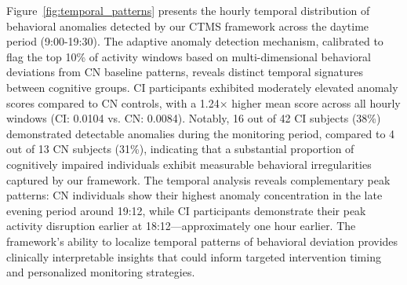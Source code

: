 \documentclass[sigconf, anonymous, 9pt, nonacm]{acmart}
\begin{document}
Figure~\ref{fig:temporal_patterns} presents the hourly temporal distribution of behavioral anomalies detected by our CTMS framework across the daytime period (9:00-19:30). The adaptive anomaly detection mechanism, calibrated to flag the top 10\% of activity windows based on multi-dimensional behavioral deviations from CN baseline patterns, reveals distinct temporal signatures between cognitive groups.
CI participants exhibited moderately elevated anomaly scores compared to CN controls, with a 1.24× higher mean score across all hourly windows (CI: 0.0104 vs. CN: 0.0084). Notably, 16 out of 42 CI subjects (38\%) demonstrated detectable anomalies during the monitoring period, compared to 4 out of 13 CN subjects (31\%), indicating that a substantial proportion of cognitively impaired individuals exhibit measurable behavioral irregularities captured by our framework.
The temporal analysis reveals complementary peak patterns: CN individuals show their highest anomaly concentration in the late evening period around 19:12, while CI participants demonstrate their peak activity disruption earlier at 18:12—approximately one hour earlier. 
The framework's ability to localize temporal patterns of behavioral deviation provides clinically interpretable insights that could inform targeted intervention timing and personalized monitoring strategies.


\end{document}
